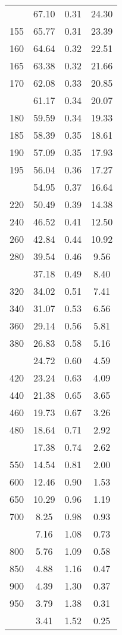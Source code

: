 \begin{table}[ht]
\begin{tabular}{lccc}
   \addlinespace
150 & 67.10 & 0.31 & 24.30 \\ 
  155 & 65.77 & 0.31 & 23.39 \\ 
  160 & 64.64 & 0.32 & 22.51 \\ 
  165 & 63.38 & 0.32 & 21.66 \\ 
  170 & 62.08 & 0.33 & 20.85 \\ 
   \addlinespace
175 & 61.17 & 0.34 & 20.07 \\ 
  180 & 59.59 & 0.34 & 19.33 \\ 
  185 & 58.39 & 0.35 & 18.61 \\ 
  190 & 57.09 & 0.35 & 17.93 \\ 
  195 & 56.04 & 0.36 & 17.27 \\ 
   \addlinespace
200 & 54.95 & 0.37 & 16.64 \\ 
  220 & 50.49 & 0.39 & 14.38 \\ 
  240 & 46.52 & 0.41 & 12.50 \\ 
  260 & 42.84 & 0.44 & 10.92 \\ 
  280 & 39.54 & 0.46 & 9.56 \\ 
   \addlinespace
300 & 37.18 & 0.49 & 8.40 \\ 
  320 & 34.02 & 0.51 & 7.41 \\ 
  340 & 31.07 & 0.53 & 6.56 \\ 
  360 & 29.14 & 0.56 & 5.81 \\ 
  380 & 26.83 & 0.58 & 5.16 \\ 
   \addlinespace
400 & 24.72 & 0.60 & 4.59 \\ 
  420 & 23.24 & 0.63 & 4.09 \\ 
  440 & 21.38 & 0.65 & 3.65 \\ 
  460 & 19.73 & 0.67 & 3.26 \\ 
  480 & 18.64 & 0.71 & 2.92 \\ 
   \addlinespace
500 & 17.38 & 0.74 & 2.62 \\ 
  550 & 14.54 & 0.81 & 2.00 \\ 
  600 & 12.46 & 0.90 & 1.53 \\ 
  650 & 10.29 & 0.96 & 1.19 \\ 
  700 & 8.25 & 0.98 & 0.93 \\ 
   \addlinespace
750 & 7.16 & 1.08 & 0.73 \\ 
  800 & 5.76 & 1.09 & 0.58 \\ 
  850 & 4.88 & 1.16 & 0.47 \\ 
  900 & 4.39 & 1.30 & 0.37 \\ 
  950 & 3.79 & 1.38 & 0.31 \\ 
   \addlinespace
1000 & 3.41 & 1.52 & 0.25 \\ 
   \bottomrule
\end{tabular}
\end{table}
